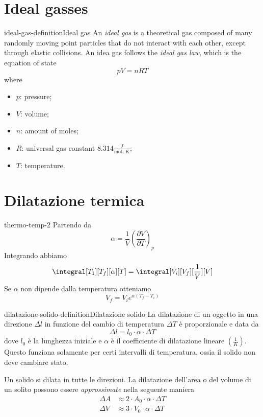 \documentclass[preview]{standalone}
\begin{document}

\section{Ideal gasses}

\begin{snippetdefinition}{ideal-gas-definition}{Ideal gas}
    An \emph{ideal gas} is a theoretical gas composed of many randomly moving point
    particles that do not interact with each other, except through elastic collisions.
    An idea gas follows the \emph{ideal gas law}, which is the equation of state
    \[
        pV = nRT
    \]
    where
    \begin{itemize}
        \item \(p\): pressure;
        \item \(V\): volume;
        \item \(n\): amount of moles;
        \item \(R\): universal gas constant \(8.314 \frac{J}{\text{mol} \cdot K}\);
        \item \(T\): temperature.
    \end{itemize}
\end{snippetdefinition}

\section{Dilatazione termica}

\begin{snippet}{thermo-temp-2}
    Partendo da
    \[
        \alpha = \frac{1}{V} {\left(\frac{\partial V}{\partial T}\right)}_p
    \]
    Integrando abbiamo
    \[
        \integral[T_1][T_f][\alpha][T] = \integral[V_i][V_f][\frac{1}{V}][V]
    \]
    Se \(\alpha\) non dipende dalla temperatura otteniamo
    \[
        V_f = V_i e^{\alpha(T_f - T_i)}
    \]
\end{snippet}

\begin{snippetdefinition}{dilatazione-solido-definition}{Dilatazione solido}
    La dilatazione di un oggetto in una direzione \(\Delta l\) in funzione del
    cambio di temperatura \(\Delta T\) è proporzionale e data da
    \[
        \Delta l = l_0 \cdot \alpha \cdot \Delta T
    \]
    dove \(l_0\) è la lunghezza iniziale e \(\alpha\) è il coefficiente di dilatazione lineare
    \((\frac{1}{K})\). Questo funziona solamente per certi intervalli di temperatura,
    ossia il solido non deve cambiare stato.
    
    Un solido si dilata in tutte le direzioni.
    La dilatazione dell'area o del volume di un solito possono essere \textit{approssimate}
    nella seguente maniera
    \begin{align*}
        \Delta A &\approx 2 \cdot A_0 \cdot \alpha \cdot \Delta T \\
        \Delta V &\approx 3 \cdot V_0 \cdot \alpha \cdot \Delta T
    \end{align*}
\end{snippetdefinition}
\end{document}
